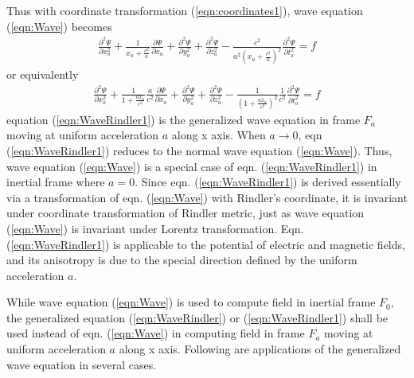 \documentclass[prd,showpacs,preprint]{revtex4}
\begin{document}
Thus with coordinate transformation (\ref{eqn:coordinates1}), wave equation (\ref{eqn:Wave}) becomes
\begin{eqnarray}
\frac{\partial^2 \Psi}{\partial x_a^2} + \frac{1}{x_a+\frac{c^2}{a}}\frac{\partial \Psi}{\partial x_a} + \frac{\partial^2 \Psi}{\partial y_a^2} + \frac{\partial^2 \Psi}{\partial z_a^2} - \frac{c^2}{a^2(x_a+\frac{c^2}{a})^2}\frac{\partial^2 \Psi}{\partial t_a^2}=f
\label{eqn:WaveRindler}
\end{eqnarray}
or equivalently
\begin{eqnarray}
\frac{\partial^2 \Psi}{\partial x_a^2} + \frac{1}{1+\frac{ax_a}{c^2}}\frac{a}{c^2}\frac{\partial \Psi}{\partial x_a} + \frac{\partial^2 \Psi}{\partial y_a^2} + \frac{\partial^2 \Psi}{\partial z_a^2} - \frac{1}{(1+\frac{ax_a}{c^2})^2}\frac{1}{c^2}\frac{\partial^2 \Psi}{\partial t_a^2}=f
\label{eqn:WaveRindler1}
\end{eqnarray}
equation (\ref{eqn:WaveRindler1}) is the generalized wave equation in frame $F_a$ moving at uniform acceleration $a$ along x axis. When $a\to 0$, eqn (\ref{eqn:WaveRindler1}) reduces to the normal wave equation (\ref{eqn:Wave}). Thus, wave equation (\ref{eqn:Wave}) is a special case of eqn. (\ref{eqn:WaveRindler1}) in inertial frame where $a=0$. Since eqn. (\ref{eqn:WaveRindler1}) is derived essentially via a transformation of eqn. (\ref{eqn:Wave}) with Rindler's coordinate, it is invariant under coordinate transformation of Rindler metric, just as wave equation (\ref{eqn:Wave}) is invariant under Lorentz transformation. Eqn. (\ref{eqn:WaveRindler1}) is applicable to the potential of electric and magnetic fields, and its anisotropy is due to the special direction defined by the uniform acceleration $a$.

While wave equation (\ref{eqn:Wave}) is used to compute field in inertial frame $F_0$, the generalized equation (\ref{eqn:WaveRindler}) or (\ref{eqn:WaveRindler1}) shall be used instead of eqn. (\ref{eqn:Wave}) in computing field in frame $F_a$ moving at uniform acceleration $a$ along x axis. Following are applications of the generalized wave equation in several cases.
\end{document}
